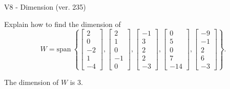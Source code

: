 \begin{exercise}
  \begin{exerciseTitle}V8 - Dimension (ver. 235)\end{exerciseTitle}
  \begin{exerciseStatement}
    Explain how to find the dimension of 
\[W=\mathrm{span}\ \left\{\left[\begin{array}{r}
2 \\
0 \\
-2 \\
1 \\
-4
\end{array}\right] , \left[\begin{array}{r}
2 \\
1 \\
0 \\
-1 \\
0
\end{array}\right] , \left[\begin{array}{r}
-1 \\
3 \\
2 \\
2 \\
-3
\end{array}\right] , \left[\begin{array}{r}
0 \\
5 \\
0 \\
7 \\
-14
\end{array}\right] , \left[\begin{array}{r}
-9 \\
-1 \\
2 \\
6 \\
-3
\end{array}\right]\right\}.\]



  \end{exerciseStatement}
  \begin{exerciseAnswer}
   The dimension of \(W\) is  \(3\).
  


  \end{exerciseAnswer}
\end{exercise}